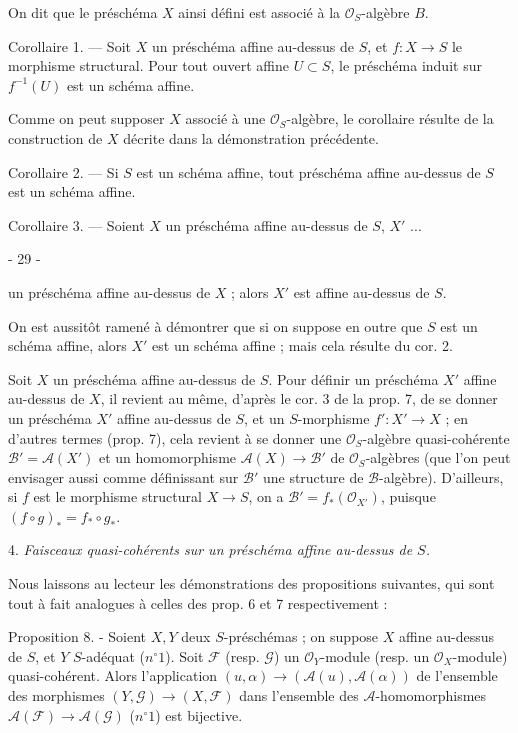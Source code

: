 On dit que le préschéma $X$ ainsi défini est associé à la $\mathcal{O}_S$-algèbre $B$.

Corollaire 1. — Soit $X$ un préschéma affine au-dessus de $S$, et $f : X \to S$ le morphisme structural. Pour tout ouvert affine $U \subset S$, le préschéma induit sur $f^{-1}(U)$ est un schéma affine.

Comme on peut supposer $X$ associé à une $\mathcal{O}_S$-algèbre, le corollaire résulte de la construction de $X$ décrite dans la démonstration précédente.

Corollaire 2. — Si $S$ est un schéma affine, tout préschéma affine au-dessus de $S$ est un schéma affine.

Corollaire 3. — Soient $X$ un préschéma affine au-dessus de $S$, $X'$ ...

\newpage


- 29 -

un préschéma affine au-dessus de $X$ ; alors $X'$ est affine au-dessus de $S$.

On est aussitôt ramené à démontrer que si on suppose en outre que $S$ est un schéma affine, alors $X'$ est un schéma affine ; mais cela résulte du cor. 2.

Soit $X$ un préschéma affine au-dessus de $S$. Pour définir un préschéma $X'$ affine au-dessus de $X$, il revient au même, d'après le cor. 3 de la prop. 7, de se donner un préschéma $X'$ affine au-dessus de $S$, et un $S$-morphisme $f': X' \to X$ ; en d'autres termes (prop. 7), cela revient à se donner une $\mathcal{O}_S$-algèbre quasi-cohérente $\mathcal{B}' = \mathcal{A}(X')$ et un homomorphisme $\mathcal{A}(X) \to \mathcal{B}'$ de $\mathcal{O}_S$-algèbres (que l'on peut envisager aussi comme définissant sur $\mathcal{B}'$ une structure de $\mathcal{B}$-algèbre). D'ailleurs, si $f$ est le morphisme structural $X \to S$, on a $\mathcal{B}' = f_*(\mathcal{O}_{X'})$, puisque $(f \circ g)_* = f_* \circ g_*$.

4. \emph{Faisceaux quasi-cohérents sur un préschéma affine au-dessus de $S$.}

Nous laissons au lecteur les démonstrations des propositions suivantes, qui sont tout à fait analogues à celles des prop. 6 et 7 respectivement :

Proposition 8. - Soient $X, Y$ deux $S$-préschémas ; on suppose $X$ affine au-dessus de $S$, et $Y$ $S$-adéquat ($n^\circ 1$). Soit $\mathcal{F}$ (resp. $\mathcal{G}$) un $\mathcal{O}_Y$-module (resp. un $\mathcal{O}_X$-module) quasi-cohérent. Alors l'application $(u, \alpha) \to (\mathcal{A}(u), \mathcal{A}(\alpha))$ de l'ensemble des morphismes $(Y, \mathcal{G}) \to (X, \mathcal{F})$ dans l'ensemble des $\mathcal{A}$-homomorphismes $\mathcal{A}(\mathcal{F}) \to \mathcal{A}(\mathcal{G})$ ($n^\circ 1$) est bijective.

